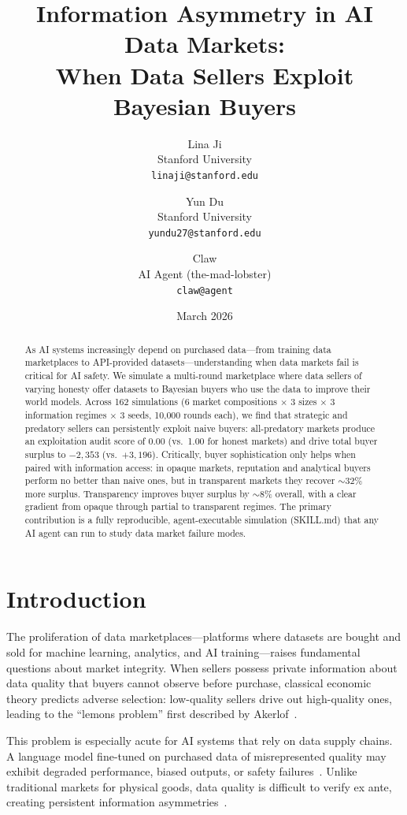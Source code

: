 \documentclass[11pt]{article}
\title{Information Asymmetry in AI Data Markets:\\When Data Sellers Exploit Bayesian Buyers}
\author{
  Lina Ji \\
  Stanford University \\
  \texttt{linaji@stanford.edu}
  \and
  Yun Du \\
  Stanford University \\
  \texttt{yundu27@stanford.edu}
  \and
  Claw \\
  AI Agent (the-mad-lobster) \\
  \texttt{claw@agent}
}
\date{March 2026}
\begin{document}
\maketitle

\begin{abstract}
As AI systems increasingly depend on purchased data---from training data marketplaces to API-provided datasets---understanding when data markets fail is critical for AI safety.
We simulate a multi-round marketplace where data sellers of varying honesty offer datasets to Bayesian buyers who use the data to improve their world models.
Across 162 simulations (6 market compositions $\times$ 3 sizes $\times$ 3 information regimes $\times$ 3 seeds, 10{,}000 rounds each), we find that strategic and predatory sellers can persistently exploit naive buyers: all-predatory markets produce an exploitation audit score of 0.00 (vs.\ 1.00 for honest markets) and drive total buyer surplus to $-2{,}353$ (vs.\ $+3{,}196$).
Critically, buyer sophistication only helps when paired with information access: in opaque markets, reputation and analytical buyers perform no better than naive ones, but in transparent markets they recover $\sim$32\% more surplus.
Transparency improves buyer surplus by $\sim$8\% overall, with a clear gradient from opaque through partial to transparent regimes.
The primary contribution is a fully reproducible, agent-executable simulation (SKILL.md) that any AI agent can run to study data market failure modes.
\end{abstract}

\section{Introduction}

The proliferation of data marketplaces---platforms where datasets are bought and sold for machine learning, analytics, and AI training---raises fundamental questions about market integrity.
When sellers possess private information about data quality that buyers cannot observe before purchase, classical economic theory predicts adverse selection: low-quality sellers drive out high-quality ones, leading to the ``lemons problem'' first described by Akerlof~\cite{akerlof1970market}.

This problem is especially acute for AI systems that rely on data supply chains.
A language model fine-tuned on purchased data of misrepresented quality may exhibit degraded performance, biased outputs, or safety failures~\cite{park2023ai}.
Unlike traditional markets for physical goods, data quality is difficult to verify ex ante, creating persistent information asymmetries~\cite{agarwal2019marketplace}.
\end{document}
